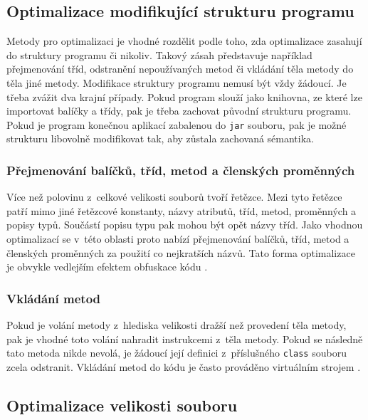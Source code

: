 \subsection{Optimalizace modifikující strukturu programu}

Metody pro optimalizaci je vhodné rozdělit podle toho, zda optimalizace zasahují do struktury programu či nikoliv. Takový zásah představuje například přejmenování tříd, odstranění nepoužívaných metod či vkládání těla metody do těla jiné metody.
Modifikace struktury programu nemusí být vždy žádoucí. Je třeba zvážit dva krajní případy. Pokud program slouží jako knihovna, ze které lze importovat balíčky a třídy, pak je třeba zachovat původní strukturu programu. Pokud je program konečnou aplikací zabalenou do \texttt{jar} souboru, pak je možné strukturu libovolně modifikovat tak, aby zůstala zachovaná sémantika.

\subsubsection{Přejmenování balíčků, tříd, metod a členských proměnných}
Více než polovinu z~celkové velikosti souborů tvoří řetězce. Mezi tyto řetězce patří mimo jiné řetězcové konstanty, názvy atributů, tříd, metod, proměnných a popisy typů. Součástí popisu typu pak mohou být opět názvy tříd. Jako vhodnou optimalizací se v~této oblasti proto nabízí přejmenování balíčků, tříd, metod a členských proměnných za použití co nejkratších názvů. Tato forma optimalizace je obvykle vedlejším efektem obfuskace kódu \cite{Chan:Obfuscation}.

\subsubsection{Vkládání metod}
Pokud je volání metody z~hlediska velikosti dražší než provedení těla metody, pak je vhodné toto volání nahradit instrukcemi z~těla metody. Pokud se následně tato metoda nikde nevolá, je žádoucí její definici z~příslušného \texttt{class} souboru zcela odstranit. Vkládání metod do kódu je často prováděno virtuálním strojem \cite{Oracle:JVM}.


\subsection{Optimalizace velikosti souboru}

